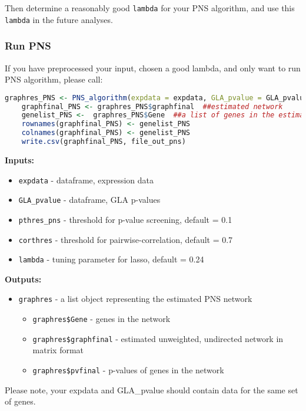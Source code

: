\documentclass{article}
\begin{document}
	Then determine a reasonably good \texttt{lambda} for your PNS algorithm, and use this \texttt{lambda} in the future analyses. 
	
	\subsubsection{Run PNS}
	If you have preprocessed your input, chosen a good lambda, and only want to run PNS algorithm, please call:

	\begin{lstlisting}[language=R]
	graphres_PNS <- PNS_algorithm(expdata = expdata, GLA_pvalue = GLA_pvalue, pthres_pns = pthres_pns, corthres = corthres, lambda = lambda)
	graphfinal_PNS <- graphres_PNS$graphfinal  ##estimated network
	genelist_PNS <-  graphres_PNS$Gene  ##a list of genes in the estimated network
	rownames(graphfinal_PNS) <- genelist_PNS
	colnames(graphfinal_PNS) <- genelist_PNS
	write.csv(graphfinal_PNS, file_out_pns)
	\end{lstlisting}
	\textbf{Inputs:}
	\begin{itemize}
		\item \texttt{expdata} - dataframe, expression data
		\item \texttt{GLA\_pvalue} - dataframe, GLA p-values
		\item \texttt{pthres\_pns} - threshold for p-value screening, default = 0.1
		\item \texttt{corthres} - threshold for pairwise-correlation, default = 0.7
		\item \texttt{lambda} - tuning parameter for lasso, default = 0.24
	\end{itemize}

	\textbf{Outputs:}
	\begin{itemize}
		\item \texttt{graphres} - a list object representing the estimated PNS network
		\begin{itemize}
			\item \texttt{graphres\$Gene} - genes in the network
			\item \texttt{graphres\$graphfinal} - estimated unweighted, undirected network in matrix format
			\item \texttt{graphres\$pvfinal} - p-values of genes in the network
		\end{itemize}
		
	\end{itemize}
	
	Please note, your expdata and GLA\_pvalue should contain data for the same set of genes.
	
\end{document}

